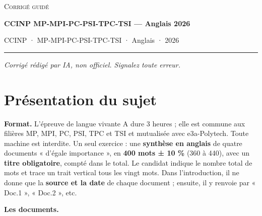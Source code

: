\documentclass[11pt,a4paper]{article}
\begin{document}
\thispagestyle{plain}
\begin{center}
  {\small\scshape Corrigé guidé}\par\smallskip
  {\LARGE\bfseries CCINP MP-MPI-PC-PSI-TPC-TSI — Anglais 2026\par}\medskip
  {\large CCINP · MP-MPI-PC-PSI-TPC-TSI · Anglais · 2026\par}
\end{center}
\vspace{2pt}\hrule\vspace{8pt}

\emph{Corrigé rédigé par IA, non officiel. Signalez toute erreur.}

\hypertarget{pruxe9sentation-du-sujet}{%
\section{Présentation du sujet}\label{pruxe9sentation-du-sujet}}

\textbf{Format.} L'épreuve de langue vivante A dure 3 heures ; elle est commune aux filières MP, MPI, PC, PSI, TPC et TSI et mutualisée avec e3a-Polytech. Toute machine est interdite. Un seul exercice : une \textbf{synthèse en anglais} de quatre documents « d'égale importance », en \textbf{400 mots ± 10 \%} (360 à 440), avec un \textbf{titre obligatoire}, compté dans le total. Le candidat indique le nombre total de mots et trace un trait vertical tous les vingt mots. Dans l'introduction, il ne donne que la \textbf{source et la date} de chaque document ; ensuite, il y renvoie par « Doc.1 », « Doc.2 », etc.

\textbf{Les documents.}
\end{document}
